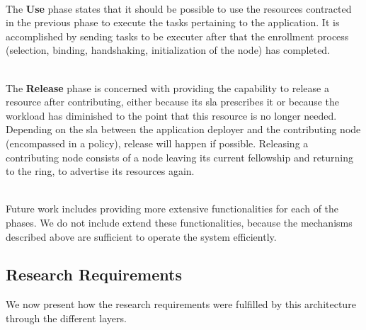 \documentclass[12pt, titlepage]{uo_temp}
\begin{document}
     \\ The \textbf{Use} phase states that it should be possible to use the resources
     contracted in the previous phase to execute the tasks pertaining to the
     application. It is accomplished by sending tasks to be executer after that the
     enrollment process (selection, binding, handshaking, initialization of the node) has
     completed.

     \\ The \textbf{Release} phase is concerned with providing the capability to release a
     resource after contributing, either because its \gls{sla} prescribes it or because
     the workload has diminished to the point that this resource is no longer
     needed. Depending on the \gls{sla} between the application deployer and the
     contributing node (encompassed in a policy), release will happen if
     possible. Releasing a contributing node consists of a node leaving its current
     fellowship and returning to the ring, to advertise its resources again.

     \\ Future work includes providing more extensive functionalities for each of the
     phases. We do not include extend these functionalities, because the mechanisms described
     above are sufficient to operate the system efficiently. 

     \subsection{Research Requirements}
     We now present how the research requirements were fulfilled by this architecture
     through the different layers.
\end{document}
